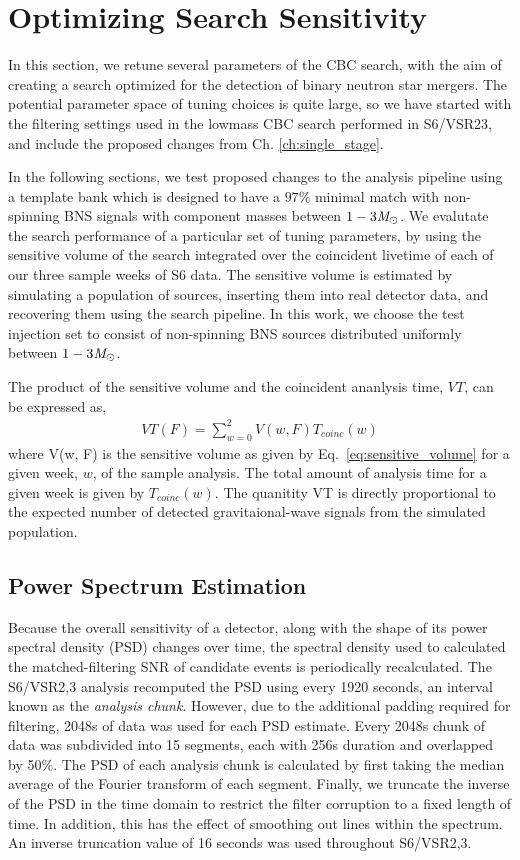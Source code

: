 \section{Optimizing Search Sensitivity}
\label{sec:tuning}

In this section, we retune several parameters of the CBC search, with the aim of creating a search optimized for the detection of binary neutron star mergers. The potential parameter space of tuning choices is quite large, so we have started with the filtering settings used in the lowmass CBC search performed in S6/VSR23, and include the proposed changes from Ch. \ref{ch:single_stage}. 

In the following sections, we test proposed changes to the analysis pipeline using a template bank which is designed to have a $97\%$ minimal match with non-spinning BNS signals with component masses between $1-3 \mathit{M}_\odot$. We evalutate the search performance of a particular set of tuning parameters, by using the  sensitive volume of the search integrated over the coincident livetime of each of our three sample weeks of S6 data. The sensitive volume is estimated by simulating a population of sources, inserting them into real detector data, and recovering them using the search pipeline. In this work, we choose the test injection set to consist of non-spinning BNS sources distributed uniformly between $1-3 \mathit{M}_\odot$.

The product of the sensitive volume and the coincident ananlysis time, $VT$, can be expressed as,
%
\begin{eqnarray}
VT (F) = \sum_{w=0}^2 V(w, F) T_{coinc}(w)
\end{eqnarray}
%
where V(w, F) is the sensitive volume as given by Eq.~\eqref{eq:sensitive_volume} for a given week, $w$, of the sample analysis. The total amount of analysis time for a given week is given by $T_{coinc}(w)$. The quanitity VT is directly proportional to the expected number of detected gravitaional-wave signals from the simulated population. 

\subsection{Power Spectrum Estimation}
\label{sec:psd}

Because the overall sensitivity of a detector, along with the shape of its power spectral density (PSD) changes over time, the spectral density used to calculated the matched-filtering SNR of candidate events is periodically recalculated. The S6/VSR2,3 analysis recomputed the PSD using every 1920 seconds, an interval known as the \emph{analysis chunk}. However, due to the additional padding required for filtering, 2048s of data was used for each PSD estimate. Every 2048s chunk of data was subdivided into 15 segments, each with 256s duration and overlapped by 50$\%$. The PSD of each analysis chunk is calculated by first taking the median average of the Fourier transform of each segment. Finally, we truncate the inverse of the PSD in the time domain to restrict the filter corruption to a fixed length of time. In addition, this has the effect of smoothing out lines within the spectrum. An inverse truncation value of 16 seconds was used throughout S6/VSR2,3. 

